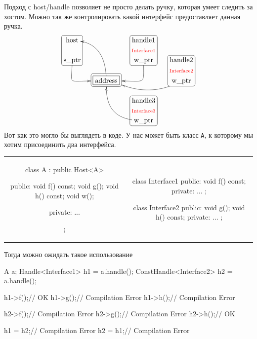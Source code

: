 Подход с host/handle позволяет не просто делать ручку, которая умеет следить за хостом.
Можно так же контролировать какой интерфейс предоставляет данная ручка.
\[
\xymatrix@R=15pt@C=15pt{
  {\text{host}}
  	{
	\save
   [].[d]*[F-:<3pt>]\frm{}
   \restore
	}
  &{}&{\text{handle1}}\ar@{}[d]|{\text{\color{red}Interface1}}
    	{
	\save
   [].[d]*[F-:<3pt>]\frm{}
   \restore
	}&{}
  \\ 
  {\text{s\_ptr}}\ar@(d,l)[dr]+(-8,0)&{}&{\text{w\_ptr}}\ar@(d,r)[dl]+(8,0)&{\text{handle2}}\ar@{}[d]|{\text{\color{red}Interface2}}
   	{
	\save
   [].[d]*[F-:<3pt>]\frm{}
   \restore
	}
  \\
  {}&{\text{address}}\ar@(u,r)[uul]
      	{
	\save
   [].[]*[F-]\frm{}
   \restore
	}
    	{
	\save
   [].[]*+[F-:<3pt>]\frm{}
   \restore
	}
  &{}&{\text{w\_ptr}}\ar@/^10pt/[ll]+(8,-2)\\
  {}&{}&{\text{handle3}}\ar@{}[d]|{\text{\color{red}Interface3}}
   	{
	\save
   [].[d]*[F-:<3pt>]\frm{}
   \restore
	}
  &{}\\
  {}&{}&{\text{w\_ptr}}\ar@(l,d)[luu]+(0,-3)&{}\\
}
\]
Вот как это могло бы выглядеть в коде.
У нас может быть класс \verb"A", к которому мы хотим присоединить два интерфейса.
\begin{center}
\begin{tabular}{cc}
{
\begin{minipage}[\baselineskip]{8cm}
\begin{cppcode}[numbers = none]
class A : public Host<A> {
public:
  void f() const;
  void g();
  void h() const;
  void w();
  
private:
  ...
};




\end{cppcode}
\end{minipage}
}&{
\begin{minipage}[\baselineskip]{8cm}
\begin{cppcode}[numbers = none]
class Interface1 {
public:
  void f() const;
private:
  ...
};

class Interface2 {
public:
  void g();
  void h() const;
private:
  ...
};
\end{cppcode}
\end{minipage}
}\\
\end{tabular}
\end{center}
Тогда можно ожидать такое использование
\begin{cppcode}
A a;
Handle<Interface1> h1 = a.handle();
ConstHandle<Interface2> h2 = a.handle();
          
h1->f();// OK
h1->g();// Compilation Error
h1->h();// Compilation Error
  
h2->f();// Compilation Error
h2->g();// Compilation Error
h2->h();// OK

h1 = h2;// Compilation Error
h2 = h1;// Compilation Error
\end{cppcode}
